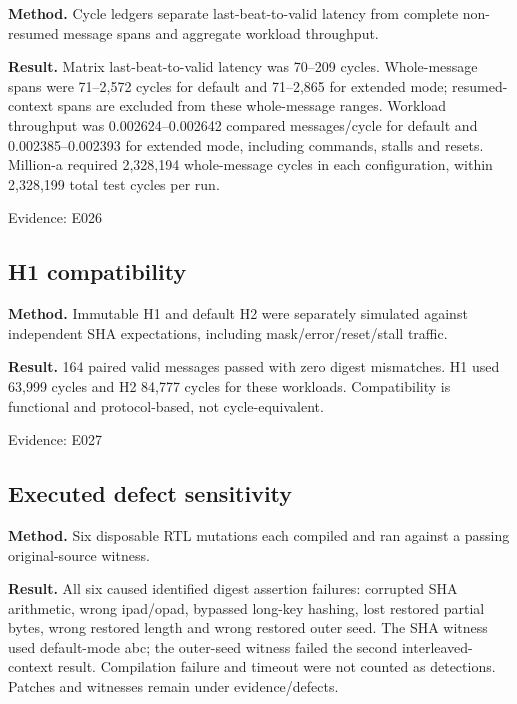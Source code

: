 \documentclass[11pt,a4paper]{article}
\begin{document}
\textbf{Method.} Cycle ledgers separate last-beat-to-valid latency from complete non-resumed message spans and aggregate workload throughput.

\textbf{Result.} Matrix last-beat-to-valid latency was 70–209 cycles. Whole-message spans were 71–2,\allowbreak{}572 cycles for default and 71–2,\allowbreak{}865 for extended mode; resumed-context spans are excluded from these whole-message ranges. Workload throughput was 0.002624–0.002642 compared messages/\allowbreak{}cycle for default and 0.002385–0.002393 for extended mode,\allowbreak{} including commands,\allowbreak{} stalls and resets. Million-a required 2,\allowbreak{}328,\allowbreak{}194 whole-message cycles in each configuration,\allowbreak{} within 2,\allowbreak{}328,\allowbreak{}199 total test cycles per run.

{\small Evidence: E026}

\subsection{H1 compatibility}

\textbf{Method.} Immutable H1 and default H2 were separately simulated against independent SHA expectations,\allowbreak{} including mask/\allowbreak{}error/\allowbreak{}reset/\allowbreak{}stall traffic.

\textbf{Result.} 164 paired valid messages passed with zero digest mismatches. H1 used 63,\allowbreak{}999 cycles and H2 84,\allowbreak{}777 cycles for these workloads. Compatibility is functional and protocol-based,\allowbreak{} not cycle-equivalent.

{\small Evidence: E027}

\subsection{Executed defect sensitivity}

\textbf{Method.} Six disposable RTL mutations each compiled and ran against a passing original-source witness.

\textbf{Result.} All six caused identified digest assertion failures: corrupted SHA arithmetic,\allowbreak{} wrong ipad/\allowbreak{}opad,\allowbreak{} bypassed long-key hashing,\allowbreak{} lost restored partial bytes,\allowbreak{} wrong restored length and wrong restored outer seed. The SHA witness used default-mode abc; the outer-seed witness failed the second interleaved-context result. Compilation failure and timeout were not counted as detections. Patches and witnesses remain under evidence/\allowbreak{}defects.
\end{document}
